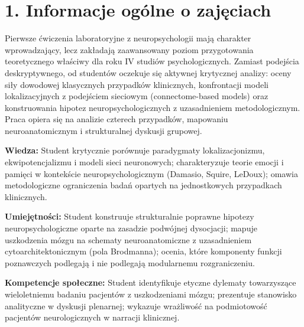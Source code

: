 \documentclass[11pt,a4paper]{article}
\begin{document}
\vspace{0.6cm}

\section*{1. Informacje ogólne o zajęciach}

Pierwsze ćwiczenia laboratoryjne z neuropsychologii mają charakter wprowadzający, lecz zakładają zaawansowany poziom przygotowania teoretycznego właściwy dla roku IV studiów psychologicznych. Zamiast podejścia deskryptywnego, od studentów oczekuje się aktywnej krytycznej analizy: oceny siły dowodowej klasycznych przypadków klinicznych, konfrontacji modeli lokalizacyjnych z podejściem sieciowym (connectome-based models) oraz konstruowania hipotez neuropsychologicznych z uzasadnieniem metodologicznym. Praca opiera się na analizie czterech przypadków, mapowaniu neuroanatomicznym i strukturalnej dyskusji grupowej.

\vspace{0.2cm}

\begin{tcolorbox}[
    enhanced,
    colback=lightbgblue,
    colframe=navyheader,
    arc=0mm,
    boxrule=1pt,
    title={\small\textbf{Cele kształcenia (zgodne z KRK -- poziom 6. EQF)}},
    coltitle=white,
    colbacktitle=navyheader,
    left=12pt,
    right=12pt,
    top=10pt,
    bottom=10pt
]
\normalsize
\textbf{Wiedza:} Student krytycznie porównuje paradygmaty lokalizacjonizmu, ekwipotencjalizmu i modeli sieci neuronowych; charakteryzuje teorie emocji i pamięci w kontekście neuropsychologicznym (Damasio, Squire, LeDoux); omawia metodologiczne ograniczenia badań opartych na jednostkowych przypadkach klinicznych.

\vspace{0.6em}

\textbf{Umiejętności:} Student konstruuje strukturalnie poprawne hipotezy neuropsychologiczne oparte na zasadzie podwójnej dysocjacji; mapuje uszkodzenia mózgu na schematy neuroanatomiczne z uzasadnieniem cytoarchitektonicznym (pola Brodmanna); ocenia, które komponenty funkcji poznawczych podlegają i nie podlegają modularnemu rozgraniczeniu.

\vspace{0.6em}

\textbf{Kompetencje społeczne:} Student identyfikuje etyczne dylematy towarzyszące wieloletniemu badaniu pacjentów z uszkodzeniami mózgu; prezentuje stanowisko analityczne w dyskusji plenarnej; wykazuje wrażliwość na podmiotowość pacjentów neurologicznych w narracji klinicznej.
\end{tcolorbox}
\end{document}
